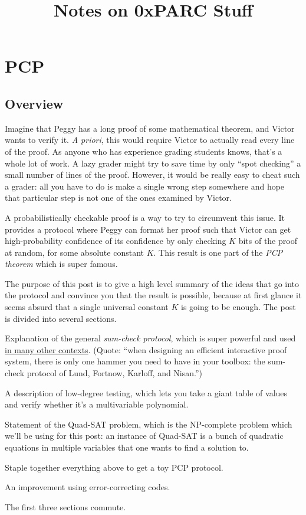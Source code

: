 \documentclass[11pt]{scrreprt}
\begin{document}
\title{Notes on 0xPARC Stuff}

\maketitle

\chapter{PCP}
\section{Overview}
Imagine that Peggy has a long proof of some mathematical theorem, and Victor wants to verify it.
\emph{A priori}, this would require Victor to actually read every line of the proof.
As anyone who has experience grading students knows, that's a whole lot of work.
A lazy grader might try to save time by only ``spot checking''
a small number of lines of the proof.
However, it would be really easy to cheat such a grader:
all you have to do is make a single wrong step somewhere
and hope that particular step is not one of the ones examined by Victor.

A probabilistically checkable proof is a way to try to circumvent this issue.
It provides a protocol where Peggy can format her proof such that
Victor can get high-probability confidence of its confidence
by only checking $K$ bits of the proof at random, for some absolute constant $K$.
This result is one part of the \emph{PCP theorem} which is super famous.

The purpose of this post is to give a high level summary of the ideas that go into the
protocol and convince you that the result is possible, because at first glance it seems
absurd that a single universal constant $K$ is going to be enough.
The post is divided into several sections.
\begin{itemize}
  \ii Explanation of the general \emph{sum-check protocol},
  which is super powerful and used
  \href{https://zkproof.org/2020/03/16/sum-checkprotocol/}{in many other contexts}.
  (Quote: ``when designing an efficient interactive proof system,
  there is only one hammer you need to have in your toolbox:
  the sum-check protocol of Lund, Fortnow, Karloff, and Nisan.'')

  \ii A description of low-degree testing, which lets you take a
  giant table of values and verify whether it's a multivariable polynomial.

  \ii Statement of the Quad-SAT problem,
  which is the NP-complete problem which we'll be using for this post:
  an instance of Quad-SAT is a bunch of quadratic equations in multiple variables
  that one wants to find a solution to.

  \ii Staple together everything above to get a toy PCP protocol.

  \ii An improvement using error-correcting codes.
\end{itemize}
The first three sections commute.
\end{document}
